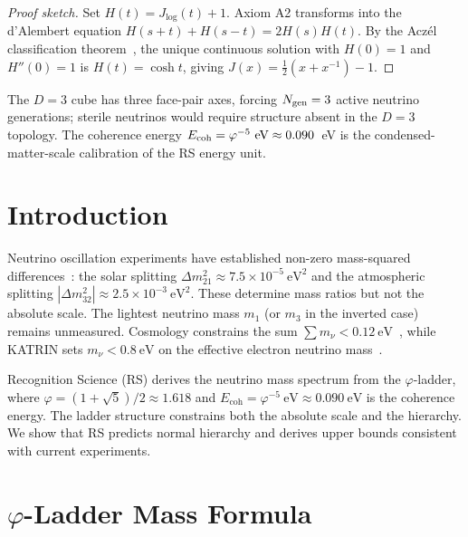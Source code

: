 \documentclass[12pt,a4paper]{article}
\theoremstyle{definition}
\theoremstyle{remark}
\begin{document}
\begin{proof}[Proof sketch]
Set $H(t) = J_{\log}(t)+1$.  Axiom A2 transforms into the d'Alembert
equation $H(s+t)+H(s-t)=2H(s)H(t)$.  By the Acz\'el classification
theorem~\cite{Aczel1966}, the unique continuous solution with $H(0)=1$
and $H''(0)=1$ is $H(t)=\cosh t$, giving
$J(x)=\tfrac{1}{2}(x+x^{-1})-1$.
\end{proof}

\noindent The $D=3$ cube has three face-pair axes, forcing
$N_{\rm gen} = 3$ active neutrino generations; sterile neutrinos
would require structure absent in the $D=3$ topology.  The
coherence energy $E_{\rm coh}=\varphi^{-5}~\text{eV}\approx 0.090$~eV
is the condensed-matter-scale calibration of the RS energy unit.

\section{Introduction}
\label{sec:intro}

Neutrino oscillation experiments have established non-zero
mass-squared differences~\cite{PDG}: the solar splitting
$\Delta m^2_{21} \approx 7.5 \times 10^{-5}~\mathrm{eV}^2$ and the
atmospheric splitting $|\Delta m^2_{32}| \approx 2.5 \times
10^{-3}~\mathrm{eV}^2$.  These determine mass ratios but not the
absolute scale.  The lightest neutrino mass $m_1$ (or $m_3$ in the
inverted case) remains unmeasured.  Cosmology constrains the sum
$\sum m_\nu < 0.12~\mathrm{eV}$~\cite{Planck}, while KATRIN sets
$m_\nu < 0.8~\mathrm{eV}$ on the effective electron neutrino
mass~\cite{KATRIN}.

Recognition Science (RS) derives the neutrino mass spectrum from the
$\varphi$-ladder, where $\varphi = (1 + \sqrt{5})/2 \approx 1.618$ and
$E_{\mathrm{coh}} = \varphi^{-5}~\mathrm{eV} \approx 0.090~\mathrm{eV}$
is the coherence energy.  The ladder structure constrains both the
absolute scale and the hierarchy.  We show that RS predicts normal
hierarchy and derives upper bounds consistent with current experiments.

\section{$\varphi$-Ladder Mass Formula}
\label{sec:formula}
\end{document}
